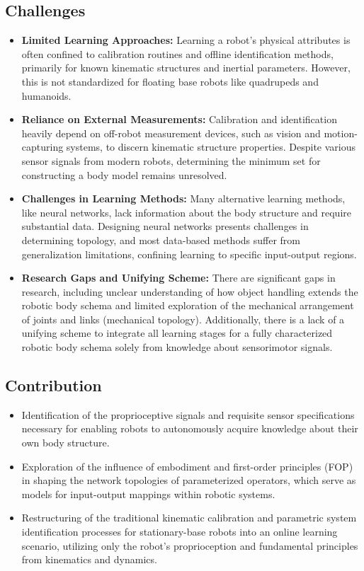 \documentclass[12pt, a4paper]{article}
\begin{document}
\begin{enumerate}
\subsection*{Challenges}
\begin{itemize}
    \item \textbf{Limited Learning Approaches:} Learning a robot's physical attributes is often confined to calibration routines and offline identification methods, primarily for known kinematic structures and inertial parameters. However, this is not standardized for floating base robots like quadrupeds and humanoids.

	\item \textbf{Reliance on External Measurements:} Calibration and identification heavily depend on off-robot measurement devices, such as vision and motion-capturing systems, to discern kinematic structure properties. Despite various sensor signals from modern robots, determining the minimum set for constructing a body model remains unresolved.

	\item \textbf{Challenges in Learning Methods:} Many alternative learning methods, like neural networks, lack information about the body structure and require substantial data. Designing neural networks presents challenges in determining topology, and most data-based methods suffer from generalization limitations, confining learning to specific input-output regions.

	\item \textbf{Research Gaps and Unifying Scheme:} There are significant gaps in research, including unclear understanding of how object handling extends the robotic body schema and limited exploration of the mechanical arrangement of joints and links (mechanical topology). Additionally, there is a lack of a unifying scheme to integrate all learning stages for a fully characterized robotic body schema solely from knowledge about sensorimotor signals. 
\end{itemize}

\subsection*{Contribution}
\begin{itemize}
	\item Identification of the proprioceptive signals and requisite sensor specifications necessary for enabling robots to autonomously acquire knowledge about their own body structure.	
	\item Exploration of the influence of embodiment and first-order principles (FOP) in shaping the network topologies of parameterized operators, which serve as models for input-output mappings within robotic systems. 	
	\item Restructuring of the traditional kinematic calibration and parametric system identification processes for stationary-base robots into an online learning scenario, utilizing only the robot's proprioception and fundamental principles from kinematics and dynamics.
\end{itemize}


\end{enumerate}
\end{document}
